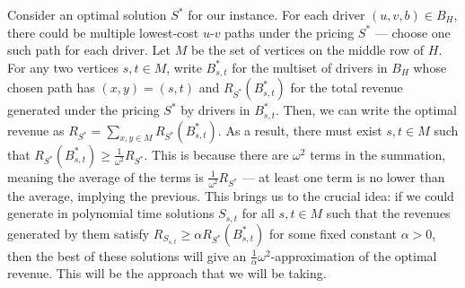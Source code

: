 Consider an optimal solution $S^*$ for our instance. For each driver $(u, v, b) \in B_H$, there could be multiple lowest-cost $u$-$v$ paths under the pricing $S^*$ --- choose one such path for each driver. Let $M$ be the set of vertices on the middle row of $H$. For any two vertices $s, t \in M$, write $B_{s, t}^*$ for the multiset of drivers in $B_H$ whose chosen path has $(x, y) = (s, t)$ and $R_{S^*}(B_{s, t}^*)$ for the total revenue generated under the pricing $S^*$ by drivers in $B_{s, t}^*$. Then, we can write the optimal revenue as  $R_{S^*} = \sum_{x, y \in M} R_{S^*}(B_{s, t}^*)$.
%
As a result, there must exist $s, t \in M$
such that $R_{S^*}(B_{s, t}^*) \geq \frac{1}{\omega^2}R_{S^*}$. This is because there are $\omega^2$ terms in the summation, meaning the average of the terms is $\frac{1}{\omega^2}R_{S^*}$ --- at least one term is no lower than the average, implying the previous.
This brings us to the crucial idea:
if we could generate in polynomial time solutions $S_{s, t}$ for all $s, t \in M$ such that the revenues generated by them satisfy
$R_{S_{s, t}} \geq \alpha R_{S^*}(B_{s, t}^*)$ for some fixed constant $\alpha > 0$,
then the best of these solutions will give an $\frac{1}{\alpha} \omega^2$-approximation of the optimal revenue.
This will be the approach that we will be taking.


